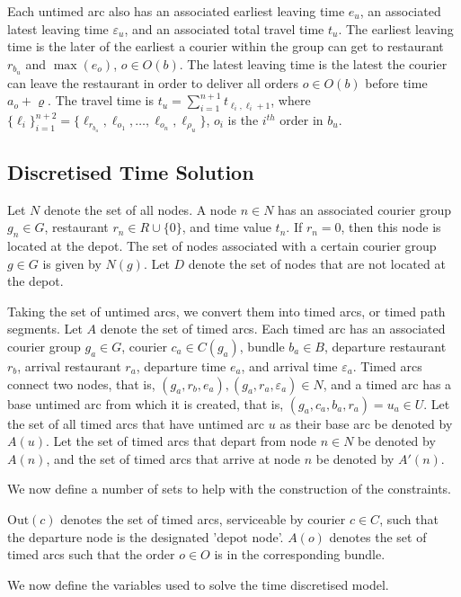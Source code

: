 \documentclass{article}
\begin{document}
Each untimed arc also has an associated earliest leaving time $e_u$, an associated latest leaving time $\varepsilon_u$, and an associated total travel time $t_u$. The earliest leaving time is the later of the earliest a courier within the group can get to restaurant $r_{b_u}$ and $\max(e_o)$, $o\in O(b)$. The latest leaving time is the latest the courier can leave the restaurant in order to deliver all orders $o\in O(b)$ before time $a_o+\varrho$. The travel time is $t_u=\sum_{i=1}^{n+1}t_{\ell_i,\ell_i+1}$, where $\{\ell_i\}_{i=1}^{n+2}=\{\ell_{r_{b_u}}, \ell_{o_1}, \dots, \ell_{o_n}, \ell_{\rho_u}\}$, $o_i$ is the $i^{th}$ order in $b_u$.

\subsection{Discretised Time Solution}

Let $N$ denote the set of all nodes. A node $n\in N$ has an associated courier group $g_n\in G$, restaurant $r_n\in R\cup\{0\}$, and time value $t_n$. If $r_n=0$, then this node is located at the depot. The set of nodes associated with a certain courier group $g\in G$ is given by $N(g)$. Let $D$ denote the set of nodes that are not located at the depot.

Taking the set of untimed arcs, we convert them into timed arcs, or timed path segments. Let $A$ denote the set of timed arcs. Each timed arc has an associated courier group $g_a\in G$, courier $c_a\in C(g_a)$, bundle $b_a\in B$, departure restaurant $r_b$, arrival restaurant $r_a$, departure time $e_a$, and arrival time $\varepsilon_a$. Timed arcs connect two nodes, that is, $(g_a, r_b, e_a), (g_a, r_a, \varepsilon_a)\in N$, and a timed arc has a base untimed arc from which it is created, that is, $(g_a, c_a, b_a, r_a)=u_a\in U$. Let the set of all timed arcs that have untimed arc $u$ as their base arc be denoted by $A(u)$. Let the set of timed arcs that depart from node $n\in N$ be denoted by $A(n)$, and the set of timed arcs that arrive at node $n$ be denoted by $A'(n)$.

We now define a number of sets to help with the construction of the constraints.

$\text{Out}(c)$ denotes the set of timed arcs, serviceable by courier $c\in C$, such that the departure node is the designated 'depot node'. $A(o)$ denotes the set of timed arcs such that the order $o\in O$ is in the corresponding bundle.

We now define the variables used to solve the time discretised model.
\end{document}

